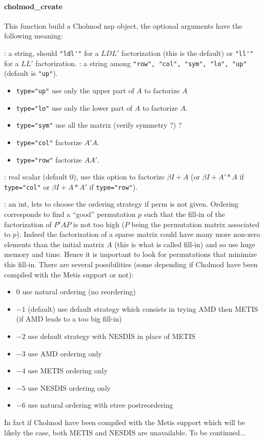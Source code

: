 \paragraph{cholmod_create}
This function build a Cholmod nsp object, the optional arguments have the following meaning:
\begin{varlist}
  : a string, should \verb+"ldl'"+ for a $LDL'$ factorization (this is the default)
                or \verb+"ll'"+ for a $LL'$ factorization.
  : a string among \verb+"row", "col", "sym", "lo", "up"+ (default is \verb+"up"+).
     \begin{itemize} 
        \item \verb+type="up"+ use only the upper part of $A$ to factorize $A$
        \item  \verb+type="lo"+ use only the lower part of $A$ to factorize $A$.
        \item  \verb+type="sym"+ use all the matrix (verify symmetry ?) ?
        \item  \verb+type="col"+ factorize $A'A$.
        \item  \verb+type="row"+ factorize $AA'$.
     \end{itemize}

  : real scalar (default 0), use this option to factorize $\beta I + A$ (or $\beta I + A'*A$ if \verb+type="col"+
                or $\beta I + A*A'$ if \verb+type="row"+).

  : an int, lets to choose the ordering strategy if perm is not given. Ordering
  corresponds to find a ``good'' permutation $p$ such that the fill-in of the factorization of
  $P' A P$ is not too high ($P$ being the permutation matrix associated to $p$). Indeed
  the factorization of a sparse matrix could have many more non-zero elements than the initial matrix 
  $A$ (this is what is called fill-in) and so use huge memory and time. Hence it is important to look 
  for permutations that minimize this fill-in. There are several possibilities (some
  depending if Cholmod have been compiled with the Metis support or not):
     \begin{itemize} 
        \item $0$ use natural ordering (no reordering)
        \item $-1$ (default) use default strategy which consists in trying AMD then METIS (if AMD
              leads to a too big fill-in)
        \item $-2$ use default strategy with NESDIS in place of METIS
        \item $-3$ use AMD ordering only
        \item $-4$ use METIS ordering only
        \item $-5$ use NESDIS ordering only
        \item $-6$ use natural ordering with etree postreordering
     \end{itemize}
  In fact if Cholmod have been compiled with the Metis support which will be likely the case, both
  METIS and NESDIS are unavailable. To be continued... 
 

\end{varlist}
